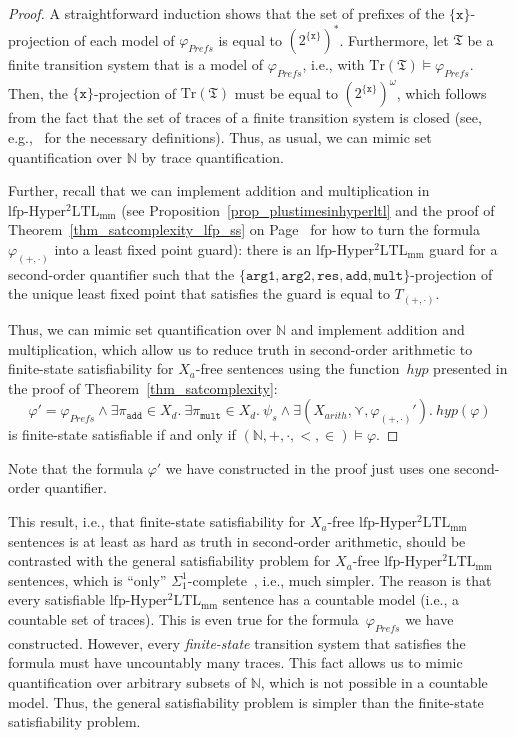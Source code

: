 \documentclass[dvipsnames,10pt,a4paper]{amsart}
\theoremstyle{definition}
\theoremstyle{remark}
\newcommand{\nats}{\mathbb{N}}
\renewcommand{\phi}{\varphi}
\newcommand{\pow}[1]{2^{#1}}
\newcommand{\set}[1]{\{#1\}}
\newcommand{\lfpsohyltlfp}{\mathrm{lfp\text{-}{Hyper^2LTL_{\mathrm{mm}}}}\xspace}
\newcommand{\univar}{X_a}
\newcommand{\unidisvar}{X_d}
\newcommand{\smallest}{\curlyvee}
\newcommand{\myquot}[1]{``#1''}
\newcommand{\tsys}{\mathfrak{T}}
\newcommand{\traces}{\mathrm{Tr}}
\newcommand{\inprop}{\mathtt{x}}
\newcommand{\argone}{\texttt{arg1}}
\newcommand{\argtwo}{\texttt{arg2}}
\newcommand{\res}{\texttt{res}}
\newcommand{\add}{\texttt{add}}
\newcommand{\mult}{\texttt{mult}}
\newcommand{\plustimes}{{(+,\cdot)}}
\newcommand{\hyperize}{{\mathit{hyp}}}
\newcommand{\arith}{\mathit{arith}}
\newcommand{\prefs}{\mathit{Prefs}}
\newcommand{\natsstruct}{(\nats, +, \cdot, <, \in)}
\begin{document}
\begin{proof}
A straightforward induction shows that the set of prefixes of the $\set{\inprop}$-projection of each model of $\phi_\prefs$ is equal to $(\pow{\set{\inprop}})^*$.
Furthermore, let $\tsys$ be a finite transition system that is a model of $\phi_\prefs$, i.e., with $\traces(\tsys) \models \phi_\prefs$. 
Then, the $\set{\inprop}$-projection of $\traces(\tsys)$ must be equal to $(\pow{\set{\inprop}})^\omega$, which follows from the fact that the set of traces of a finite transition system is closed (see, e.g.,~\cite{BK08} for the necessary definitions).
Thus, as usual, we can mimic set quantification over $\nats$ by trace quantification. 

Further, recall that we can implement addition and multiplication in $\lfpsohyltlfp$ (see Proposition~\ref{prop_plustimesinhyperltl} and the proof of Theorem~\ref{thm_satcomplexity_lfp_ss} on Page~\pageref{pageref_plustimesaslfp} for how to turn the formula~$\phi_\plustimes$ into a least fixed point guard): there is an $\lfpsohyltlfp$ guard for a second-order quantifier such that the $\set{\argone, \argtwo, \res, \add, \mult}$-projection of the unique least fixed point that satisfies the guard is equal to $T_\plustimes$.

Thus, we can mimic set quantification over $\nats$ and implement addition and multiplication, which allow us to reduce truth in second-order arithmetic to finite-state satisfiability for $\univar$-free sentences using the function~$\hyperize$ presented in the proof of Theorem~\ref{thm_satcomplexity}:
\[
\phi' = \phi_\prefs \wedge \exists \pi_\add \in \unidisvar.\ \exists \pi_\mult \in \unidisvar.\ \psi_s \wedge \exists(X_\arith, \smallest, \phi_\plustimes').\ \hyperize(\phi)
\]
is finite-state satisfiable if and only if $\natsstruct\models\phi$.
\end{proof}
Note that the formula $\phi'$ we have constructed in the proof just uses one second-order quantifier.

This result, i.e., that finite-state satisfiability for $\univar$-free $\lfpsohyltlfp$  sentences is at least as hard as truth in second-order arithmetic, should be contrasted with the general satisfiability problem for $\univar$-free $\lfpsohyltlfp$ sentences, which is \myquot{only} $\Sigma_1^1$-complete~\cite{sohypercomplexity}, i.e., much simpler. 
The reason is that every satisfiable $\lfpsohyltlfp$ sentence has a countable model (i.e., a countable set of traces). 
This is even true for the formula~$\phi_\prefs$ we have constructed. However, every \emph{finite-state} transition system that satisfies the formula must have uncountably many traces. 
This fact allows us to mimic quantification over arbitrary subsets of $\nats$, which is not possible in a countable model. 
Thus, the general satisfiability problem is simpler than the finite-state satisfiability problem.
\end{document}
